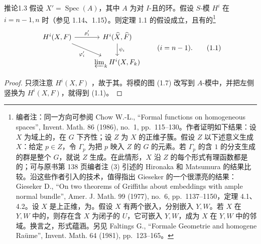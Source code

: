 \begin{SGAresult}{推论}{1.3}
假设 $X'=\operatorname{Spec}(A)$，其中 $A$ 为对 $I$-且的环。假设 $S$-模 $H^i$ 在 $i=n-1,n$ 时（参见 1.14、1.15）。则定理 1.1 的假设成立，且有的\footnote{编者注：同一方向可参阅 Chow W.-L., ``Formal functions on homogeneous spaces'', Invent. Math. 86 (1986), no.~1, pp.~115--130。作者证明如下结果：设 $X$ 为域上的，在 $G$ 下齐性；设 $Z$ 为 $X$ 的正维子簇。假设 $Z$ 以下述意义生成 $X$：给定 $p\in Z$，令 $\Gamma_p$ 为把 $p$ 映入 $Z$ 的 $G$ 的元素。若 $\Gamma_p$ 的含 $1$ 的分支生成的群是整个 $G$，就说 $Z$ 生成。在此情形，$X$ 沿 $Z$ 的每个形式有理函数都是的；可与原书第 138 页编者注 (3) 引述的 Hironaka 和 Matsumura 的结果比较。沿这些作者引入的技术，值得指出 Gieseker 的一个很漂亮的结果：Gieseker D., ``On two theorems of Griffiths about embeddings with ample normal bundle'', Amer. J. Math. 99 (1977), no.~6, pp.~1137--1150，定理 4.1、4.2。设 $X$ 是上正维，为。假设 $X$ 有两个嵌入，分别嵌入 $Y,W$。若 $X$ 在 $Y,W$ 中的，则存在含 $X$ 为闭子的 $U$，它可嵌入 $Y,W$，成为 $X$ 在 $Y,W$ 中的邻域。换言之，形式蕴涵。另见 Faltings G., ``Formale Geometrie and homogene Raüme'', Invent. Math. 64 (1981), pp.~123--165。}
\[\begin{tikzcd}H^i(X,F)\arrow[r,"\rho'_i"]\arrow[dr,"\varphi'_i"']&H^i(\widehat X,\widehat F)\arrow[d,"\psi_i"]\\&\varprojlim_kH^i(X,F_k)\end{tikzcd}\qquad(i=n-1).\tag{1.1}\]
\end{SGAresult}
\begin{proof}
只须注意 $H^i(X,F)$ ，故于其。将模的图 (1.7) 改写到 $A$-模中，并把左侧竖换为 $H^i(X,F)$，就得到 (1.1)。
\end{proof}
